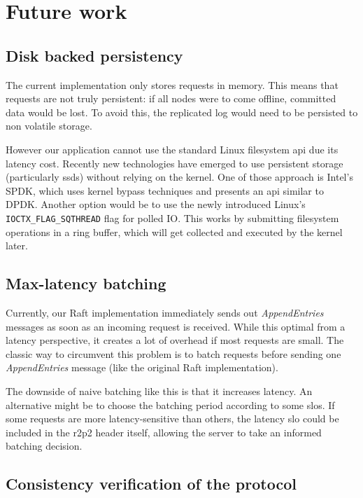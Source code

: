 \chapter{Future work}

\section{Disk backed persistency}

The current implementation only stores requests in memory.
This means that requests are not truly persistent: if all nodes were to come offline, committed data would be lost.
To avoid this, the replicated log would need to be persisted to non volatile storage.

However our application cannot use the standard Linux filesystem \gls{api} due its latency cost.
Recently new technologies have emerged to use persistent storage (particularly \glspl{ssd}) without relying on the kernel.
One of those approach is Intel's SPDK\cite{spdk}, which uses kernel bypass techniques and presents an \gls{api} similar to DPDK.
Another option would be to use the newly introduced Linux's \texttt{IOCTX\_FLAG\_SQTHREAD} flag for polled IO.
This works by submitting filesystem operations in a ring buffer, which will get collected and executed by the kernel later.

\section{Max-latency batching}

Currently, our Raft implementation immediately sends out \emph{AppendEntries} messages as soon as an incoming request is received.
While this optimal from a latency perspective, it creates a lot of overhead if most requests are small.
The classic way to circumvent this problem is to batch requests before sending one \emph{AppendEntries} message (\ie like the original Raft implementation\cite{raft}).

The downside of naive batching like this is that it increases latency.
An alternative might be to choose the batching period according to some \glspl{slo}.
If some requests are more latency-sensitive than others, the latency \gls{slo} could be included in the \gls{r2p2} header itself, allowing the server to take an informed batching decision.


\section{Consistency verification of the protocol}

